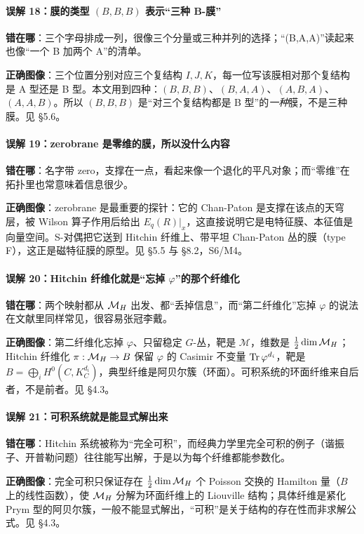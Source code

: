 \paragraph{误解 18：膜的类型 $(B,B,B)$ 表示“三种 B-膜”}
\mbox{}\par\noindent
\textbf{错在哪}：三个字母排成一列，很像三个分量或三种并列的选择；“(B,A,A)”读起来也像“一个 B 加两个 A”的清单。
\par\noindent
\textbf{正确图像}：三个位置分别对应三个复结构 $I,J,K$，每一位写该膜相对那个复结构是 A 型还是 B 型。本文用到四种：$(B,B,B)$、$(B,A,A)$、$(A,B,A)$、$(A,A,B)$。所以 $(B,B,B)$ 是“对三个复结构都是 B 型”的\emph{一种}膜，不是三种膜。见 \S5.6。

\paragraph{误解 19：zerobrane 是零维的膜，所以没什么内容}
\mbox{}\par\noindent
\textbf{错在哪}：名字带 zero，支撑在一点，看起来像一个退化的平凡对象；而“零维”在拓扑里也常意味着信息很少。
\par\noindent
\textbf{正确图像}：zerobrane 是最重要的探针：它的 Chan-Paton 是支撑在该点的天穹层，被 Wilson 算子作用后给出 $E_q(R)|_x$，这直接说明它是电特征膜、本征值是向量空间。S-对偶把它送到 Hitchin 纤维上、带平坦 Chan-Paton 丛的膜（type F），这正是磁特征膜的原型。见 \S5.5 与 \S8.2，S6/M4。

\paragraph{误解 20：Hitchin 纤维化就是“忘掉 $\varphi$”的那个纤维化}
\mbox{}\par\noindent
\textbf{错在哪}：两个映射都从 $\mathcal{M}_H$ 出发、都“丢掉信息”，而“第二纤维化”忘掉 $\varphi$ 的说法在文献里同样常见，很容易张冠李戴。
\par\noindent
\textbf{正确图像}：第二纤维化忘掉 $\varphi$、只留稳定 $G$-丛，靶是 $\mathcal{M}$，维数是 $\frac12\dim\mathcal{M}_H$；Hitchin 纤维化 $\pi:\mathcal{M}_H\to B$ 保留 $\varphi$ 的 Casimir 不变量 $\operatorname{Tr}\varphi^{d_i}$，靶是 $B=\bigoplus_iH^0(C,K_C^{d_i})$，典型纤维是阿贝尔簇（环面）。可积系统的环面纤维来自后者，不是前者。见 \S4.3。

\paragraph{误解 21：可积系统就是能显式解出来}
\mbox{}\par\noindent
\textbf{错在哪}：Hitchin 系统被称为“完全可积”，而经典力学里完全可积的例子（谐振子、开普勒问题）往往能写出解，于是以为每个纤维都能参数化。
\par\noindent
\textbf{正确图像}：完全可积只保证存在 $\frac12\dim\mathcal{M}_H$ 个 Poisson 交换的 Hamilton 量（$B$ 上的线性函数），使 $\mathcal{M}_H$ 分解为环面纤维上的 Liouville 结构；具体纤维是紧化 Prym 型的阿贝尔簇，一般不能显式解出，“可积”是关于结构的存在性而非求解公式。见 \S4.3。

